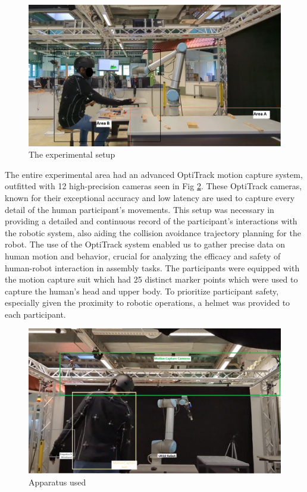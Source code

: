\begin{figure}[h] 

    \centering 

    \includegraphics[width=0.8\columnwidth]{images/Setup.png} 

    \caption{The experimental setup} 

    \label{fig:setup} 

\end{figure} 





The entire experimental area had an advanced OptiTrack motion capture system, outfitted with 12 high-precision cameras seen in Fig \ref{fig:apparatus}. These OptiTrack cameras, known for their exceptional accuracy and low latency are used to capture every detail of the human participant's movements. This setup was necessary in providing a detailed and continuous record of the participant's interactions with the robotic system, also aiding the collision avoidance trajectory planning for the robot. The use of the OptiTrack system enabled us to gather precise data on human motion and behavior, crucial for analyzing the efficacy and safety of human-robot interaction in assembly tasks. The participants were equipped with the motion capture suit which had 25 distinct marker points which were used to capture the human's head and upper body. To prioritize participant safety, especially given the proximity to robotic operations, a helmet was provided to each participant.

\begin{figure}[hb]
	\centering
	\includegraphics[width=0.8\columnwidth]{images/apparatus.png}
	\caption{Apparatus used}
	\label{fig:apparatus}
\end{figure}

